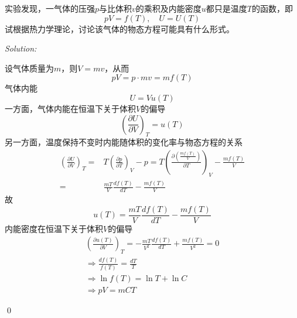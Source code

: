 \documentclass[12pt,a4paper]{article}
\newenvironment{problem}[2][Problem]{\begin{trivlist}
\item[\hskip \labelsep {\bfseries #1}\hskip \labelsep {\bfseries #2.}]}{\end{trivlist}}
\newenvironment{sol}
    {\emph{Solution:}
    }
    {
    \qed
    }
\begin{document}
\begin{problem}{2.7}
实验发现，一气体的压强$p$与比体积$v$的乘积及内能密度$u$都只是温度$T$的函数，即
\[
pV=f(T),\quad U=U(T)
\]
试根据热力学理论，讨论该气体的物态方程可能具有什么形式。
\end{problem}
\begin{sol}
设气体质量为$m$，则$V=mv$，从而
\begin{equation}
pV=p\cdot mv=mf(T)
\end{equation}
气体内能
\begin{equation}
U=Vu(T)
\end{equation}
一方面，气体内能在恒温下关于体积$V$的偏导
\begin{equation}
\left(\frac{\partial U}{\partial V}\right)_T=u(T)
\end{equation}
另一方面，温度保持不变时内能随体积的变化率与物态方程的关系
\begin{align}
\nonumber\left(\frac{\partial U}{\partial V}\right)_T=&T\left(\frac{\partial p}{\partial T}\right)_V-p=T\left(\frac{\partial\left(\frac{mf(T)}{V}\right)}{\partial T}\right)_V-\frac{mf(T)}{V}\\
=&\frac{mT}{V}\frac{df(T)}{dT}-\frac{mf(T)}{V}
\end{align}
故
\begin{equation}
u(T)=\frac{mT}{V}\frac{df(T)}{dT}-\frac{mf(T)}{V}
\end{equation}
内能密度在恒温下关于体积$V$的偏导
\begin{gather}
\left(\frac{\partial u(T)}{\partial V}\right)_T=-\frac{mT}{V^2}\frac{df(T)}{dT}+\frac{mf(T)}{V^2}=0\\
\Longrightarrow\frac{df(T)}{f(T)}=\frac{dT}{T}\\
\Longrightarrow\ln f(T)=\ln T+\ln C\\
\Longrightarrow pV=mCT
\end{gather}
\end{sol}
\end{document}
